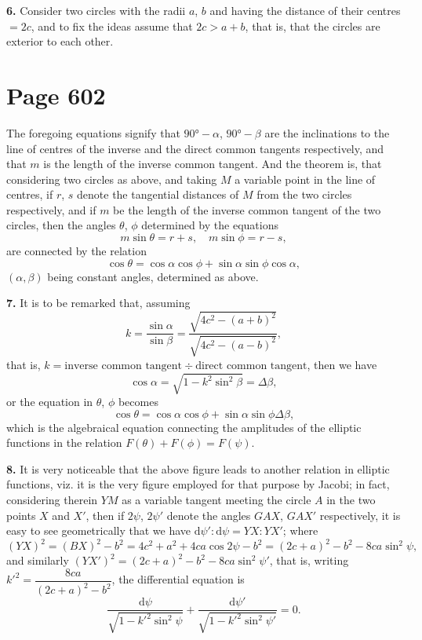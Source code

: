 \documentclass[12pt,a4paper]{article}
\theoremstyle{plain}
\theoremstyle{definition}
\theoremstyle{remark}
\begin{document}
\medskip\noindent\textbf{6.} Consider two circles with the radii $a$, $b$ and having the distance of their centres $= 2c$, and to fix the ideas assume that $2c > a + b$, that is, that the circles are exterior to each other.

\section*{Page 602}
\setcounter{page}{602}

The foregoing equations signify that $90° - \alpha$, $90° - \beta$ are the inclinations to the line of centres of the inverse and the direct common tangents respectively, and that $m$ is the length of the inverse common tangent. And the theorem is, that considering two circles as above, and taking $M$ a variable point in the line of centres, if $r$, $s$ denote the tangential distances of $M$ from the two circles respectively, and if $m$ be the length of the inverse common tangent of the two circles, then the angles $\theta$, $\phi$ determined by the equations
\[
m\sin\theta = r + s, \quad m\sin\phi = r - s,
\]
are connected by the relation
\[
\cos\theta = \cos\alpha\cos\phi + \sin\alpha\sin\phi\cos\alpha,
\]
$(\alpha, \beta)$ being constant angles, determined as above.

\medskip\noindent\textbf{7.} It is to be remarked that, assuming
\[
k = \frac{\sin\alpha}{\sin\beta} = \frac{\sqrt{4c^2 - (a+b)^2}}{\sqrt{4c^2 - (a-b)^2}},
\]
that is, $k = \text{inverse common tangent} \div \text{direct common tangent}$, then we have
\[
\cos\alpha = \sqrt{1 - k^2\sin^2\beta} = \Delta\beta,
\]
or the equation in $\theta$, $\phi$ becomes
\[
\cos\theta = \cos\alpha\cos\phi + \sin\alpha\sin\phi\Delta\beta,
\]
which is the algebraical equation connecting the amplitudes of the elliptic functions in the relation $F(\theta) + F(\phi) = F(\psi)$.

\medskip\noindent\textbf{8.} It is very noticeable that the above figure leads to another relation in elliptic functions, viz. it is the very figure employed for that purpose by Jacobi; in fact, considering therein $YM$ as a variable tangent meeting the circle $A$ in the two points $X$ and $X'$, then if $2\psi$, $2\psi'$ denote the angles $GAX$, $GAX'$ respectively, it is easy to see geometrically that we have $\mathrm{d}\psi' : \mathrm{d}\psi = YX : YX'$; where
\[
(YX)^2 = (BX)^2 - b^2 = 4c^2 + a^2 + 4ca\cos 2\psi - b^2 = (2c+a)^2 - b^2 - 8ca\sin^2\psi,
\]
and similarly $(YX')^2 = (2c+a)^2 - b^2 - 8ca\sin^2\psi'$, that is, writing $k'^2 = \dfrac{8ca}{(2c+a)^2 - b^2}$, the differential equation is
\[
\frac{\mathrm{d}\psi}{\sqrt{1 - k'^2\sin^2\psi}} + \frac{\mathrm{d}\psi'}{\sqrt{1 - k'^2\sin^2\psi'}} = 0.
\]
\end{document}
